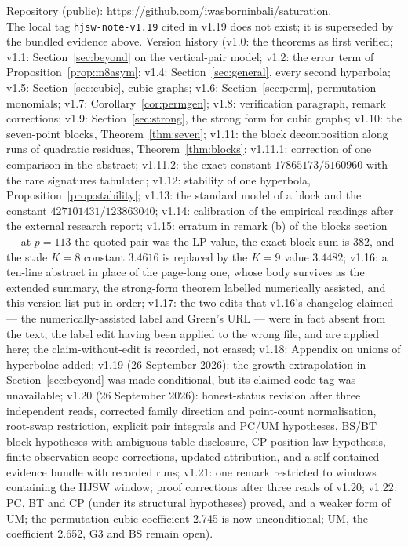 \documentclass[11pt]{article}
\theoremstyle{remark}
\begin{document}
{\sloppy Repository (public): \url{https://github.com/iwasborninbali/saturation}.\\
The local tag \texttt{hjsw-note-v1.19} cited in v1.19 does not exist; it is superseded by the bundled evidence above.  Version history (v1.0: the theorems as first verified; v1.1: Section~\ref{sec:beyond} on the vertical-pair model; v1.2: the error term of Proposition~\ref{prop:m8asym}; v1.4: Section~\ref{sec:general}, every second hyperbola; v1.5: Section~\ref{sec:cubic}, cubic graphs; v1.6: Section~\ref{sec:perm}, permutation monomials; v1.7: Corollary~\ref{cor:permgen}; v1.8: verification paragraph, remark corrections; v1.9: Section~\ref{sec:strong}, the strong form for cubic graphs; v1.10: the seven-point blocks, Theorem~\ref{thm:seven}; v1.11: the block decomposition along runs of quadratic residues, Theorem~\ref{thm:blocks}; v1.11.1: correction of one comparison in the abstract; v1.11.2: the exact constant $17865173/5160960$ with the rare signatures tabulated; v1.12: stability of one hyperbola, Proposition~\ref{prop:stability}; v1.13: the standard model of a block and the constant $427101431/123863040$; v1.14: calibration of the empirical readings after the external research report; v1.15: erratum in remark (b) of the blocks section --- at $p=113$ the quoted pair was the LP value, the exact block sum is $382$, and the stale $K=8$ constant $3.4616$ is replaced by the $K=9$ value $3.4482$; v1.16: a ten-line abstract in place of the page-long one, whose body survives as the extended summary, the strong-form theorem labelled numerically assisted, and this version list put in order; v1.17: the two edits that v1.16's changelog claimed --- the numerically-assisted label and Green's URL --- were in fact absent from the text, the label edit having been applied to the wrong file, and are applied here; the claim-without-edit is recorded, not erased; v1.18: Appendix on unions of hyperbolae added; v1.19 (26 September 2026): the growth extrapolation in Section~\ref{sec:beyond} was made conditional, but its claimed code tag was unavailable;
v1.20 (26 September 2026): honest-status revision after three independent reads, corrected family direction and point-count normalisation,
root-swap restriction, explicit pair integrals and PC/UM hypotheses, BS/BT block hypotheses with ambiguous-table disclosure,
CP position-law hypothesis, finite-observation scope corrections, updated attribution, and a self-contained evidence bundle with recorded runs;
v1.21: one remark restricted to windows containing the HJSW window; proof corrections after three reads of v1.20;
v1.22: PC, BT and CP (under its structural hypotheses) proved, and a weaker form of UM; the permutation-cubic coefficient 2.745 is now unconditional; UM, the coefficient 2.652, G3 and BS remain open).\par}
\end{document}
